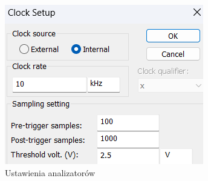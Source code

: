 \documentclass[a4paper]{article}
\begin{document}
\begin{figure}[H]
    \centering
    \includegraphics{direction_controller_test_logic_analizer_settings.png}
    \caption{Ustawienia analizatorów}
\end{figure}
\end{document}

